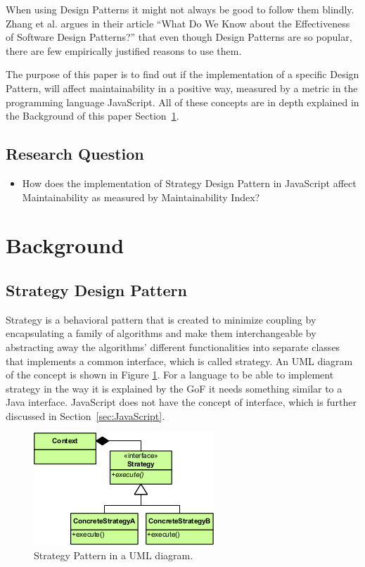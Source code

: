 \documentclass[conference, a4paper]{IEEEtran}
\begin{document}
When using Design Patterns it might not always be good to follow them blindly. Zhang et al. argues in their article ``What Do We Know about the Effectiveness of Software Design Patterns?'' that even though Design Patterns are so popular, there are few empirically justified reasons to use them.~\cite{bibitem:Zhang}

The purpose of this paper is to find out if the implementation of a specific Design Pattern, will affect maintainability in a positive way, measured by a metric in the programming language JavaScript. All of these concepts are in depth explained in the Background of this paper Section~\ref{sec:Background}.

\subsection{Research Question}
\begin{itemize}
	\item How does the implementation of Strategy Design Pattern in JavaScript affect Maintainability as measured by Maintainability Index?
\end{itemize}

\section{Background}
\label{sec:Background}

\subsection{Strategy Design Pattern}
\label{sec:Strategy}

Strategy is a behavioral pattern that is created to minimize coupling by encapsulating a family of algorithms and make them interchangeable by abstracting away the algorithms' different functionalities into separate classes that implements a common interface, which is called strategy. An UML diagram of the concept is shown in Figure \ref{fig:Strategy}. For a language to be able to implement strategy in the way it is explained by the GoF it needs something similar to a Java interface. JavaScript does not have the concept of interface, which is further discussed in Section~\ref{sec:JavaScript}.~\cite{bibitem:GoF}

\begin{figure}[ht!]
	\centering
	\includegraphics[scale=0.7]{Strategy_Pattern_in_UML.png}
	\caption{Strategy Pattern in a UML diagram.}
	\label{fig:Strategy}
\end{figure}
\end{document}
